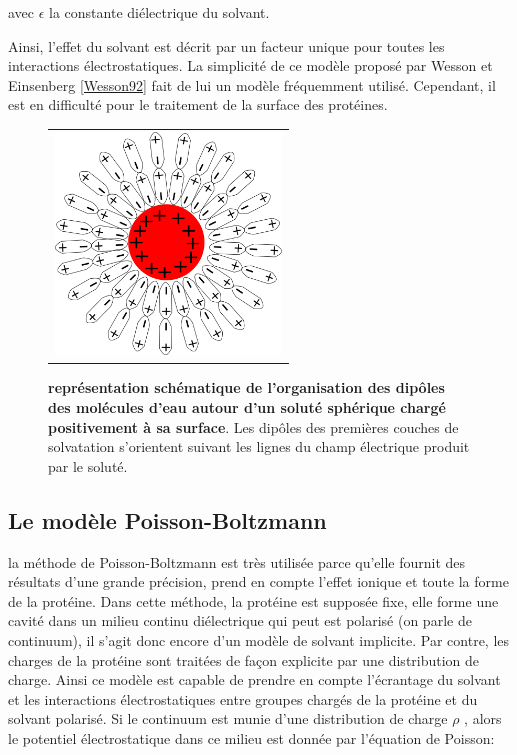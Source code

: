 avec $ \epsilon $ la constante diélectrique du solvant.

Ainsi, l'effet du solvant est décrit par un facteur unique pour toutes les interactions électrostatiques. La simplicité de ce modèle proposé par Wesson et Einsenberg \ref{Wesson92} fait de lui un modèle fréquemment utilisé. Cependant, il est en difficulté pour le traitement de la surface des protéines.


   \begin{figure}[!htbp]
     \centering
     \begin{tabular}{c}
       \includegraphics[width=6cm]{figure/ecrantage.png} &
     \end{tabular}
     
     \caption{\textbf{représentation schématique de l'organisation des dipôles des molécules d'eau autour d'un soluté sphérique chargé positivement à sa surface}. Les dipôles des premières couches de solvatation s'orientent suivant les lignes du champ électrique produit par le soluté.}
\label{graph:ecrantage}
   \end{figure}
   


\subsection{Le modèle Poisson-Boltzmann}
la méthode de Poisson-Boltzmann est très utilisée parce qu'elle fournit des résultats d'une grande précision, prend en compte l'effet ionique et toute la forme de la protéine. Dans cette méthode, la protéine est supposée fixe, elle forme une cavité dans un milieu continu diélectrique qui peut est polarisé (on parle de continuum), il s'agit donc encore d'un modèle de solvant implicite. Par contre, les charges de la protéine sont traitées de façon explicite par une distribution de charge. Ainsi ce modèle est capable de prendre en compte l'écrantage du solvant et les interactions électrostatiques entre groupes chargés de la protéine et du solvant polarisé. Si le continuum est munie d'une distribution de charge $\rho$ , alors le potentiel électrostatique dans ce milieu est donnée par l'équation de Poisson:

